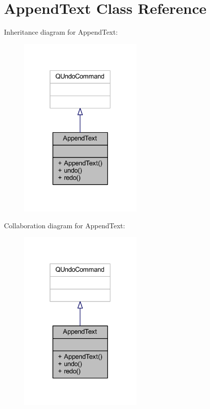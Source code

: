 \hypertarget{class_append_text}{}\section{Append\+Text Class Reference}
\label{class_append_text}


Inheritance diagram for Append\+Text\+:
\nopagebreak
\begin{figure}[H]
\begin{center}
\leavevmode
\includegraphics[width=171pt]{class_append_text__inherit__graph}
\end{center}
\end{figure}


Collaboration diagram for Append\+Text\+:
\nopagebreak
\begin{figure}[H]
\begin{center}
\leavevmode
\includegraphics[width=171pt]{class_append_text__coll__graph}
\end{center}
\end{figure}
